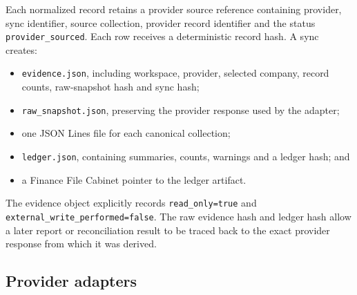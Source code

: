 Each normalized record retains a provider source reference containing provider,
sync identifier, source collection, provider record identifier and the status
\texttt{provider\_sourced}.  Each row receives a deterministic record hash.  A
sync creates:

\begin{itemize}[leftmargin=*]
  \item \texttt{evidence.json}, including workspace, provider, selected company,
        record counts, raw-snapshot hash and sync hash;
  \item \texttt{raw\_snapshot.json}, preserving the provider response used by
        the adapter;
  \item one JSON Lines file for each canonical collection;
  \item \texttt{ledger.json}, containing summaries, counts, warnings and a
        ledger hash; and
  \item a Finance File Cabinet pointer to the ledger artifact.
\end{itemize}

The evidence object explicitly records \texttt{read\_only=true} and
\texttt{external\_write\_performed=false}.  The raw evidence hash and ledger
hash allow a later report or reconciliation result to be traced back to the
exact provider response from which it was derived.

\subsection{Provider adapters}

